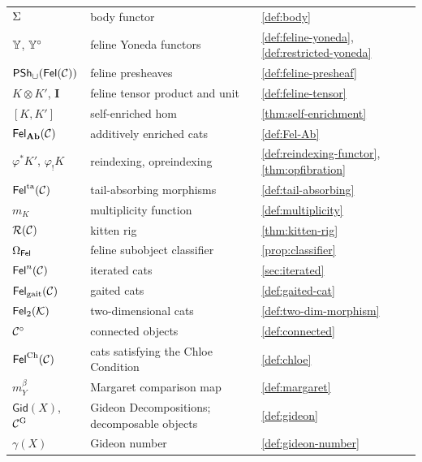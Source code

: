 {\begin{longtable}{p{}p{}p{}}
$\Sigma$ & body functor & \ref{def:body}\\
$\mathbb{Y}$, $\mathbb{Y}^\circ$ & feline Yoneda functors & \ref{def:feline-yoneda}, \ref{def:restricted-yoneda}\\
$\mathsf{PSh}_\sqcup(\mathsf{Fel}(\mathcal{C}))$ & feline presheaves & \ref{def:feline-presheaf}\\
$K\otimes K'$, $\mathbf I$ & feline tensor product and unit & \ref{def:feline-tensor}\\
$[K,K']$ & self-enriched hom & \ref{thm:self-enrichment}\\
$\mathsf{Fel}_{\mathbf{Ab}}(\mathcal{C})$ & additively enriched cats & \ref{def:Fel-Ab}\\
$\varphi^*K'$, $\varphi_!K$ & reindexing, opreindexing & \ref{def:reindexing-functor}, \ref{thm:opfibration}\\
$\mathsf{Fel}^{\mathrm{ta}}(\mathcal{C})$ & tail-absorbing morphisms & \ref{def:tail-absorbing}\\
$m_K$ & multiplicity function & \ref{def:multiplicity}\\
$\mathcal R(\mathcal{C})$ & kitten rig & \ref{thm:kitten-rig}\\
$\Omega_{\mathsf{Fel}}$ & feline subobject classifier & \ref{prop:classifier}\\
$\mathsf{Fel}^n(\mathcal{C})$ & iterated cats & \ref{sec:iterated}\\
$\mathsf{Fel}_{\mathrm{gait}}(\mathcal{C})$ & gaited cats & \ref{def:gaited-cat}\\
$\mathsf{Fel}_2(\mathcal{K})$ & two-dimensional cats & \ref{def:two-dim-morphism}\\
$\mathcal{C}^\circ$ & connected objects & \ref{def:connected}\\
$\mathsf{Fel}^{\mathrm{Ch}}(\mathcal{C})$ & cats satisfying the Chloe Condition & \ref{def:chloe}\\
$m^\beta_Y$ & Margaret comparison map & \ref{def:margaret}\\
$\mathsf{Gid}(X)$, $\mathcal{C}^{\mathrm{G}}$ & Gideon Decompositions; decomposable objects & \ref{def:gideon}\\
$\gamma(X)$ & Gideon number & \ref{def:gideon-number}\\
\end{longtable}
}
